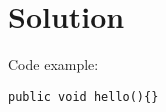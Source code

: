 \documentclass[Main]{subfiles}
\begin{document}
\chapter{Solution}

















Code example:
\begin{lstlisting}[caption=Overskrift på boks, style=Code-C++, label=lst:referenceLabel]
public void hello(){}
\end{lstlisting}
\end{document}
